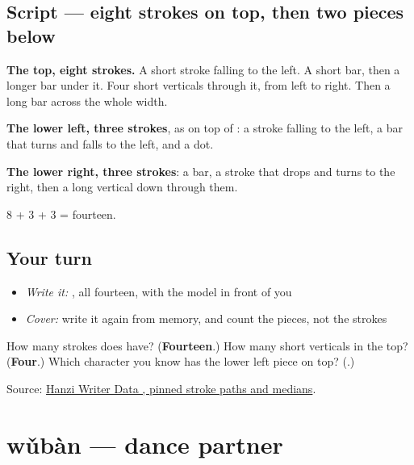 \subsection*{Script — eight strokes on top, then two pieces below}

\begin{quote}
\end{quote}

\textbf{The top, eight strokes.} A short stroke falling to the left. A short bar, then a longer bar under it. Four short verticals through it, from left to right. Then a long bar across the whole width.

\textbf{The lower left, three strokes}, as on top of : a stroke falling to the left, a bar that turns and falls to the left, and a dot.

\textbf{The lower right, three strokes}: a bar, a stroke that drops and turns to the right, then a long vertical down through them.

8 + 3 + 3 = fourteen.

\subsection*{Your turn}
\begin{itemize}
\raggedright
  \item \emph{Write it:} , all fourteen, with the model in front of you
  \item \emph{Cover:} write it again from memory, and count the pieces, not the strokes
\end{itemize}

\begin{tcolorbox}[breakable,colback=teal!4,colframe=teal!35!black,title={Before you move on}]
How many strokes does  have? (\textbf{Fourteen}.) How many short verticals in the top? (\textbf{Four}.) Which character you know has the lower left piece on top? (\textbf{}.)

Source: \href{https://raw.githubusercontent.com/chanind/hanzi-writer-data/68d10a4b21150cae5e1ebbd223eed289cf32d90c/data/\%E8\%88\%9E.json}{Hanzi Writer Data , pinned stroke paths and medians}.
\end{tcolorbox}
\section[wǔbàn]{wǔbàn — dance partner}

